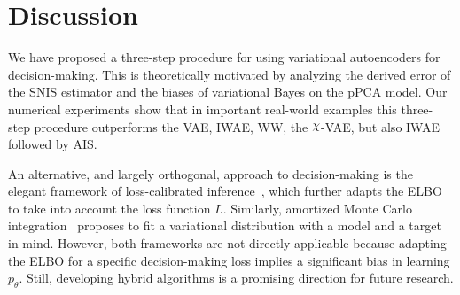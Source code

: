 \section{Discussion}
We have proposed a three-step procedure for using variational autoencoders for decision-making. This is theoretically motivated by analyzing the derived error of the SNIS estimator and the biases of variational Bayes on the pPCA model. Our numerical experiments show that in important real-world examples this three-step procedure outperforms the VAE, IWAE, WW, the $\rchi$-VAE, but also IWAE followed by AIS. %


An alternative, and largely orthogonal, approach to decision-making is the elegant framework of loss-calibrated inference~\cite{lacoste2011approximate,NIPS2019_8868}, which further adapts the ELBO to take into account the loss function $L$. Similarly, amortized Monte Carlo integration~\cite{golinski2019amortized} proposes to fit a variational distribution with a model and a target in mind. However, both frameworks are not directly applicable because adapting the ELBO for a specific decision-making loss implies a significant bias in learning $p_\theta$. Still, developing hybrid algorithms is a promising direction for future research.

